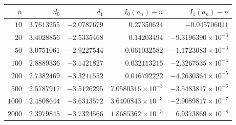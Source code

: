 \begin{tabular}{rrrrr}
\toprule
$n$ & $d_0$ & $d_1$ & $I_0(a_n)-n$ & $I_1(a_n)-n$ \\
\midrule
$10$ & $3.7613255$ & $-2.0787679$ & $0.27350624$ & $-0.045706011$ \\
$20$ & $3.4028856$ & $-2.5335468$ & $0.14203494$ & $-9.3196390\times10^{-3}$ \\
$50$ & $3.0751061$ & $-2.9227544$ & $0.061032582$ & $-1.1723083\times10^{-3}$ \\
$100$ & $2.8889336$ & $-3.1421827$ & $0.032113215$ & $-2.3267535\times10^{-4}$ \\
$200$ & $2.7382469$ & $-3.3211552$ & $0.016792222$ & $-4.2630364\times10^{-5}$ \\
$500$ & $2.5787917$ & $-3.5126295$ & $7.0580316\times10^{-3}$ & $-3.5483817\times10^{-6}$ \\
$1000$ & $2.4808644$ & $-3.6313572$ & $3.6400843\times10^{-3}$ & $-2.9089817\times10^{-7}$ \\
$2000$ & $2.3979845$ & $-3.7324566$ & $1.8685362\times10^{-3}$ & $6.9373869\times10^{-8}$ \\
\bottomrule
\end{tabular}
